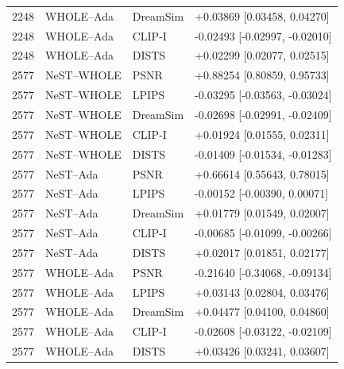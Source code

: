 \documentclass[10pt,letterpaper]{article}
\begin{document}
\begin{longtable}{@{}rlll@{}}
2248 & WHOLE--Ada & DreamSim & +0.03869 [0.03458, 0.04270]\\
2248 & WHOLE--Ada & CLIP-I & -0.02493 [-0.02997, -0.02010]\\
2248 & WHOLE--Ada & DISTS & +0.02299 [0.02077, 0.02515]\\
2577 & NeST--WHOLE & PSNR & +0.88254 [0.80859, 0.95733]\\
2577 & NeST--WHOLE & LPIPS & -0.03295 [-0.03563, -0.03024]\\
2577 & NeST--WHOLE & DreamSim & -0.02698 [-0.02991, -0.02409]\\
2577 & NeST--WHOLE & CLIP-I & +0.01924 [0.01555, 0.02311]\\
2577 & NeST--WHOLE & DISTS & -0.01409 [-0.01534, -0.01283]\\
2577 & NeST--Ada & PSNR & +0.66614 [0.55643, 0.78015]\\
2577 & NeST--Ada & LPIPS & -0.00152 [-0.00390, 0.00071]\\
2577 & NeST--Ada & DreamSim & +0.01779 [0.01549, 0.02007]\\
2577 & NeST--Ada & CLIP-I & -0.00685 [-0.01099, -0.00266]\\
2577 & NeST--Ada & DISTS & +0.02017 [0.01851, 0.02177]\\
2577 & WHOLE--Ada & PSNR & -0.21640 [-0.34068, -0.09134]\\
2577 & WHOLE--Ada & LPIPS & +0.03143 [0.02804, 0.03476]\\
2577 & WHOLE--Ada & DreamSim & +0.04477 [0.04100, 0.04860]\\
2577 & WHOLE--Ada & CLIP-I & -0.02608 [-0.03122, -0.02109]\\
2577 & WHOLE--Ada & DISTS & +0.03426 [0.03241, 0.03607]\\
\bottomrule\end{longtable}
\end{document}

